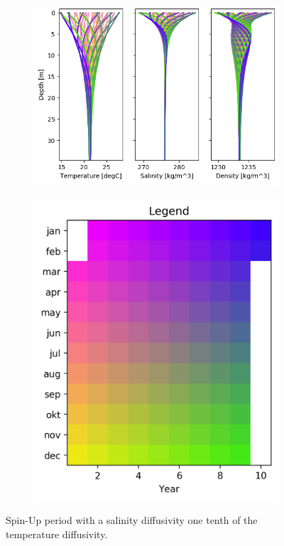\documentclass[twocolumn]{article}
\begin{document}
%
\begin{figure}
\begin{subfigure}[h]{0.65\textwidth}
\centering
\includegraphics[width=\textwidth,keepaspectratio]{SDA-01_TDA-1_SpinUp.png}
\label{fig:}
\end{subfigure}\hfill
\begin{subfigure}[h]{0.25\textwidth}
\centering
\includegraphics[width=\textwidth,keepaspectratio]{SDA-01_TDA-1_SpinUp_Legend.png}
\label{fig:}
\end{subfigure}\hfill
\caption{Spin-Up period with a salinity diffusivity one tenth of the temperature diffusivity. }
\label{fig:SpinUp_dencity_balance_example}
\end{figure}
\end{document}
